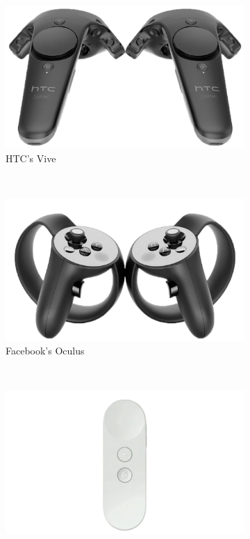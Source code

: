 \begin{figure}
  \centering
	\begin{subfigure}{.4\columnwidth}
  \includegraphics[width=\textwidth]{figures/controllerVive}
  \caption{HTC's Vive }\label{fig:controllerVive}
  \end{subfigure}
  \\
  \begin{subfigure}{.4\columnwidth}
  \includegraphics[width=\textwidth]{figures/controllerOculus}
  \caption{Facebook's Oculus}\label{fig:controllerOculus}
  \end{subfigure}
  \\
  \begin{subfigure}{.4\columnwidth}
  \includegraphics[width=\textwidth]{figures/controllerDaydream}

\end{subfigure}
\end{figure}
